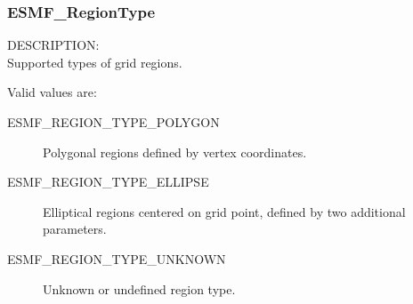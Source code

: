 \subsubsection{ESMF\_RegionType}

{\sf DESCRIPTION:\\}
Supported types of grid regions.

Valid values are:
\begin{description}
   \item [ESMF\_REGION\_TYPE\_POLYGON]
         Polygonal regions defined by vertex coordinates.
   \item [ESMF\_REGION\_TYPE\_ELLIPSE]
         Elliptical regions centered on grid point, defined by two 
         additional parameters.
   \item [ESMF\_REGION\_TYPE\_UNKNOWN]
         Unknown or undefined region type.
\end{description}










